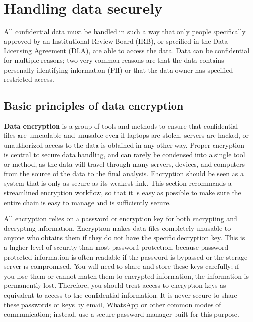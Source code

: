 \section{Handling data securely}

All confidential data must be handled in such a way that only people specifically
approved by an Institutional Review Board (IRB),
or specified in the Data Licensing Agreement (DLA),
are able to access the data.
Data can be confidential for multiple reasons;
two very common reasons are that the data contains
personally-identifying information (PII)
or that the data owner has specified restricted access.

\subsection{Basic principles of data encryption}

\textbf{Data encryption} is a group of tools and methods
to ensure that confidential files are unreadable and unusable
even if laptops are stolen, servers are hacked,
or unauthorized access to the data is obtained in any other way.
Proper encryption is central to secure data handling,
and can rarely be condensed into a single tool or method,
as the data will travel through many servers, devices, and computers
from the source of the data to the final analysis.
Encryption should be seen as a system
that is only as secure as its weakest link.
This section recommends a streamlined encryption workflow,
so that it is easy as possible to make sure
the entire chain is easy to manage and is sufficiently secure.

All encryption relies on a password or encryption key
for both encrypting and decrypting information.
Encryption makes data files completely unusable
to anyone who obtains them if they do not have the specific decryption key.
This is a higher level of security than most password-protection,
because password-protected information is often readable
if the password is bypassed or the storage server is compromised.
You will need to share and store these keys carefully;
if you lose them or cannot match them to encrypted information,
the information is permanently lost.
Therefore, you should treat access to encryption keys
as equivalent to access to the confidential information.
It is never secure to share these passwords or keys by email,
WhatsApp or other common modes of communication;
instead, use a secure password manager built for this purpose.

